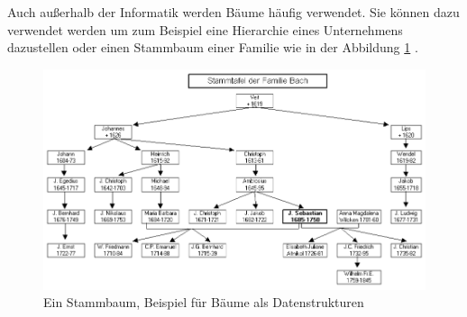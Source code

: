 Auch außerhalb der Informatik werden Bäume häufig verwendet. Sie können 
dazu verwendet werden um zum Beispiel eine Hierarchie eines Unternehmens
dazustellen oder einen Stammbaum einer 
Familie wie in der Abbildung \ref{pic:stammbaum} \cite[]{q4}.

\begin{figure}[h]
    \centering
    \includegraphics[scale=0.7]{abbildungen/Stammbaum.png}
    \caption{Ein Stammbaum, Beispiel für Bäume als Datenstrukturen \cite[]{q4}}
    \label{pic:stammbaum}
\end{figure}
